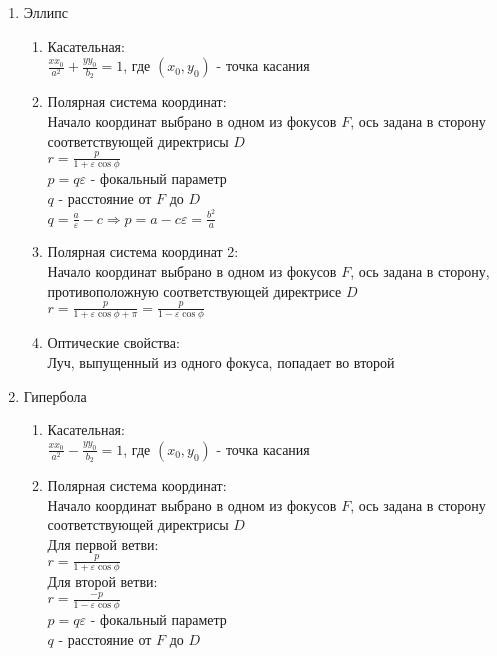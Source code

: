 \documentclass[12pt]{article}
\begin{document}
\begin{enumerate}
    \item Эллипс
    \begin{enumerate}
        \item Касательная:\\
        $\frac{xx_0}{a^2}+\frac{yy_0}{b_2} = 1$, где $(x_0, y_0)$ - точка касания
        \item Полярная система координат:\\
        Начало координат выбрано в одном из фокусов $F$, ось задана в сторону соответствующей директрисы $D$\\
        $r=\frac{p}{1+\varepsilon\cos\phi}$\\
        $p = q\varepsilon$ - фокальный параметр\\
        $q$ - расстояние от $F$ до $D$\\
        $q = \frac a\varepsilon - c \Rightarrow p=a-c\varepsilon = \frac{b^2}a$
        \item Полярная система координат 2:\\
        Начало координат выбрано в одном из фокусов $F$, ось задана в сторону, противоположную соответствующей директрисе $D$\\
        $r=\frac{p}{1+\varepsilon\cos\phi+\pi} = \frac{p}{1-\varepsilon\cos\phi}$
        \item Оптические свойства:\\
        Луч, выпущенный из одного фокуса, попадает во второй        
    \end{enumerate}
    \item Гипербола
    \begin{enumerate}
        \item Касательная:\\
        $\frac{xx_0}{a^2}-\frac{yy_0}{b_2} = 1$, где $(x_0, y_0)$ - точка касания
        \item Полярная система координат:\\
        Начало координат выбрано в одном из фокусов $F$, ось задана в сторону соответствующей директрисы $D$\\
        Для первой ветви:\\
        $r=\frac{p}{1+\varepsilon\cos\phi}$\\
        Для второй ветви:\\
        $r=\frac{-p}{1-\varepsilon\cos\phi}$\\
        $p = q\varepsilon$ - фокальный параметр\\
        $q$ - расстояние от $F$ до $D$\\

\end{enumerate}
\end{enumerate}
\end{document}
